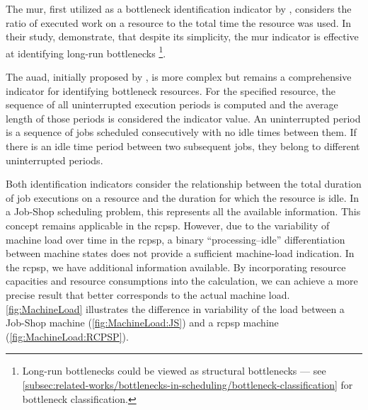 The \ac{mur}, first utilized as a bottleneck identification indicator by \citet{Lawrence1994},
considers the ratio of executed work on a resource to the total time the resource was used.
In their study, \citet{Lawrence1994} demonstrate, that despite its simplicity,
the \ac{mur} indicator is effective at identifying long-run bottlenecks%
\footnote{
Long-run bottlenecks could be viewed as structural bottlenecks ---
see \cref{subsec:related-works/bottlenecks-in-scheduling/bottleneck-classification} for bottleneck classification.
}.


The \ac{auad}, initially proposed by \citet{Roser2001},
is more complex but remains a comprehensive indicator for identifying bottleneck resources.
For the specified resource, the sequence of all uninterrupted execution periods is computed
and the average length of those periods is considered the indicator value.
An uninterrupted period is a sequence of jobs scheduled consecutively with no idle times between them.
If there is an idle time period between two subsequent jobs,
they belong to different uninterrupted periods.

Both identification indicators consider the relationship between the total duration
of job executions on a resource and the duration for which the resource is idle.
In a Job-Shop scheduling problem,
this represents all the available information.
This concept remains applicable in the \ac{rcpsp}.
However, due to the variability of machine load over time in the \ac{rcpsp},
a binary \enquote{processing--idle} differentiation between machine states
does not provide a sufficient machine-load indication.
In the \ac{rcpsp}, we have additional information available.
By incorporating resource capacities and resource consumptions into the calculation,
we can achieve a more precise result that better corresponds to the actual machine load.
\cref{fig:MachineLoad} illustrates the difference in variability of the load between
a Job-Shop machine (\cref{fig:MachineLoad:JS})
and a \ac{rcpsp} machine (\cref{fig:MachineLoad:RCPSP}).

